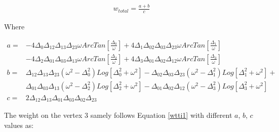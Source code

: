 \documentclass[10pt]{article}
\begin{document}
\begin{eqnarray}\label{wtti1}
w_{total}=\frac{a+b}{c}
\end{eqnarray}

Where

\begin{subequations}\label{wtti1a}
\begin{align}
a=&-4\Delta_0\Delta_{12}\Delta_{13}\Delta_{23}\omega ArcTan[\frac{\Delta_0}{\omega}]+4\Delta_1\Delta_{02}\Delta_{03}\Delta_{23}\omega ArcTan[\frac{\Delta_1}{\omega}]\nonumber\\&-4\Delta_2\Delta_{01}\Delta_{03}\Delta_{13}\omega ArcTan[\frac{\Delta_2}{\omega}]+4\Delta_3\Delta_{01}\Delta_{02}\Delta_{12}\omega ArcTan[\frac{\Delta_3}{\omega}]\\
b=&\Delta_{12}\Delta_{13}\Delta_{23}(\omega^2-\Delta_0^2)Log[\Delta_0^2+\omega^2]-\Delta_{02}\Delta_{03}\Delta_{23}(\omega^2-\Delta_1^2)Log[\Delta_1^2+\omega^2]+\nonumber\\&\Delta_{01}\Delta_{03}\Delta_{13}(\omega^2-\Delta_2^2)Log[\Delta_2^2+\omega^2]-\Delta_{01}\Delta_{02}\Delta_{12}(\omega^2-\Delta_3^2)Log[\Delta_3^2+\omega^2]\\
c=&2\Delta_{12}\Delta_{13}\Delta_{01}\Delta_{03}\Delta_{02}\Delta_{23}
\end{align}
\end{subequations}

The weight on the vertex 3 samely follows Equation \ref{wtti1} with different $a$, $b$, $c$ values as: 
\end{document}
